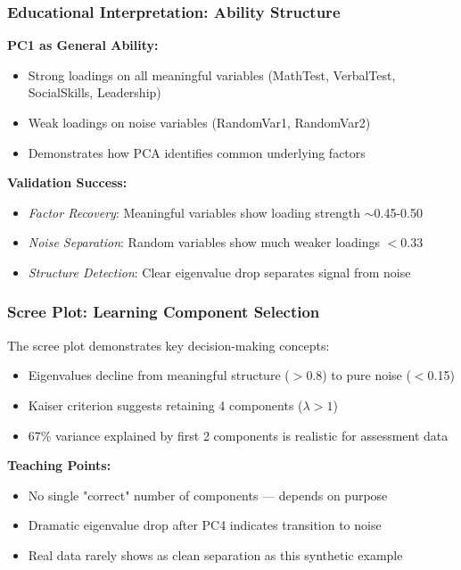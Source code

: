 \documentclass[aspectratio=169]{beamer}
\begin{document}
\begin{frame}
    \frametitle{Educational Interpretation: Ability Structure}
    \textbf{PC1 as General Ability:}
    \begin{itemize}
        \item Strong loadings on all meaningful variables (MathTest, VerbalTest, SocialSkills, Leadership) \pause
        \item Weak loadings on noise variables (RandomVar1, RandomVar2) \pause
        \item Demonstrates how PCA identifies common underlying factors \pause
    \end{itemize}
    \vspace{12pt}
    \textbf{Validation Success:}
    \begin{itemize}
        \item \textit{Factor Recovery}: Meaningful variables show loading strength $\sim$0.45-0.50 \pause
        \item \textit{Noise Separation}: Random variables show much weaker loadings $<$0.33 \pause
        \item \textit{Structure Detection}: Clear eigenvalue drop separates signal from noise \pause
    \end{itemize}
\end{frame}

\begin{frame}
    \frametitle{Scree Plot: Learning Component Selection}
    The scree plot demonstrates key decision-making concepts:
    \begin{itemize}
        \item Eigenvalues decline from meaningful structure ($>$0.8) to pure noise ($<$0.15) \pause
        \item Kaiser criterion suggests retaining 4 components ($\lambda > 1$) \pause
        \item 67\% variance explained by first 2 components is realistic for assessment data \pause
    \end{itemize}
    \vspace{12pt}
    \textbf{Teaching Points:}
    \begin{itemize}
        \item No single "correct" number of components — depends on purpose \pause
        \item Dramatic eigenvalue drop after PC4 indicates transition to noise \pause
        \item Real data rarely shows as clean separation as this synthetic example \pause
    \end{itemize}
\end{frame}
\end{document}
